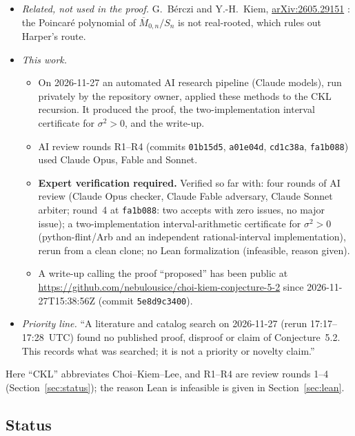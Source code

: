 \documentclass[11pt]{amsart}
\theoremstyle{definition}
\theoremstyle{remark}
\numberwithin{equation}{section}
\newcommand{\Mbar}{\overline{M}}
\begin{document}
\begin{itemize}
\begin{itemize}
  \item Singularity analysis: P.~Flajolet and A.~Odlyzko, SIAM J. Discrete Math. 3 (1990) 216--240 \cite{FO}.
  \item M.~Drmota and B.~Gittenberger, J. Graph Theory 31 (1999) 227--253 \cite{DG}.
  \end{itemize}
\item \emph{Related, not used in the proof.} G.~B\'erczi and Y.-H.~Kiem, \href{https://arxiv.org/abs/2605.29151}{arXiv:2605.29151} \cite{BK}: the Poincar\'e polynomial of \(\Mbar_{0,n}/S_n\) is not real-rooted, which rules out Harper's route.
\item \emph{This work.}
  \begin{itemize}
  \item On 2026-11-27 an automated AI research pipeline (Claude models), run privately by the repository owner, applied these methods to the CKL recursion. It produced the proof, the two-implementation interval certificate for \(\sigma^2>0\), and the write-up.
  \item AI review rounds R1--R4 (commits \texttt{01b15d5}, \texttt{a01e04d}, \texttt{cd1c38a}, \texttt{fa1b088}) used Claude Opus, Fable and Sonnet.
  \item \textbf{Expert verification required.} Verified so far with: four rounds of AI review (Claude Opus checker, Claude Fable adversary, Claude Sonnet arbiter; round~4 at \texttt{fa1b088}: two accepts with zero issues, no major issue); a two-implementation interval-arithmetic certificate for \(\sigma^2>0\) (python-flint/Arb and an independent rational-interval implementation), rerun from a clean clone; no Lean formalization (infeasible, reason given).
  \item A write-up calling the proof ``proposed'' has been public at \url{https://github.com/nebulousice/choi-kiem-conjecture-5-2} since 2026-11-27T15:38:56Z (commit \texttt{5e8d9c3400}).
  \end{itemize}
\item \emph{Priority line.} ``A literature and catalog search on 2026-11-27 (rerun 17:17--17:28~UTC) found no published proof, disproof or claim of Conjecture~5.2. This records what was searched; it is not a priority or novelty claim.''
\end{itemize}
Here ``CKL'' abbreviates Choi--Kiem--Lee, and R1--R4 are review rounds 1--4 (Section~\ref{sec:status}); the reason Lean is infeasible is given in Section~\ref{sec:lean}.

\subsection{Status}
\end{document}
